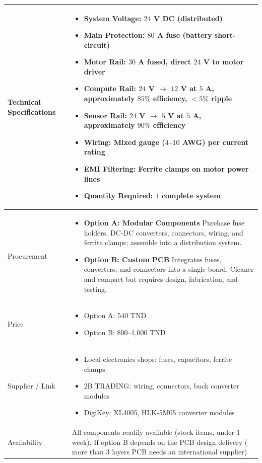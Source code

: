 \documentclass[12pt,a4paper]{article}
\begin{document}
\begin{longtable}{|p{4cm}|p{10cm}|}
Technical Specifications &
\begin{itemize}
\item System Voltage: $24$ V DC (distributed)
\item Main Protection: $80$ A fuse (battery short-circuit)
\item Motor Rail: $30$ A fused, direct $24$ V to motor driver
\item Compute Rail: $24$ V $\rightarrow$ $12$ V at $5$ A, approximately $85\%$ efficiency, $<5\%$ ripple
\item Sensor Rail: $24$ V $\rightarrow$ $5$ V at $5$ A, approximately $90\%$ efficiency
\item Wiring: Mixed gauge ($4$--$10$ AWG) per current rating
\item EMI Filtering: Ferrite clamps on motor power lines
\item Quantity Required: $1$ complete system
\end{itemize}
\\
\hline

Procurement &
\begin{itemize}
    \item \textbf{Option A: Modular Components} Purchase fuse holders, DC-DC converters, connectors, wiring, and ferrite clamps; assemble into a distribution system.
    \item \textbf{Option B: Custom PCB} Integrates fuses, converters, and connectors into a single board. Cleaner and compact but requires design, fabrication, and testing.
\end{itemize} \\
\hline

Price &
 \begin{itemize}
    \item Option A: 540 TND
    \item Option B: 800--1,000 TND
\end{itemize}\\
\hline

Supplier / Link &
\begin{itemize}
\item Local electronics shops: fuses, capacitors, ferrite clamps
\item 2B TRADING: wiring, connectors, buck converter modules
\item DigiKey: XL4005, HLK-5M05 converter modules
\end{itemize}
\\
\hline

Availability &
All components readily available (stock items, under 1 week). 
If option B depends on the PCB design delivery ( more than 3 layers PCB needs an international supplier)\\
\hline


\end{longtable}
\end{document}
